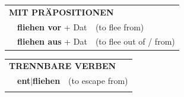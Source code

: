 \documentclass[10pt,a4paper]{revtex4-2}
\begin{document}
\begin{verbbox}
   \vspace{10pt}

   \begin{tabular}{lll}
      \multicolumn{3}{l}{\textbf{MIT PRÄPOSITIONEN}}\\
& \textbf{fliehen vor} + Dat & (to flee from)\\
& \textbf{fliehen aus} + Dat & (to flee out of / from)\\
\end{tabular}
  \hfill
   \begin{tabular}{lll}
      \multicolumn{3}{l}{\textbf{TRENNBARE VERBEN}}\\
 & \textbf{ent$|$fliehen} & (to escape from)\\
\vspace{10pt}
  \end{tabular}

  \vspace{-5pt}

\end{verbbox}
\end{document}
